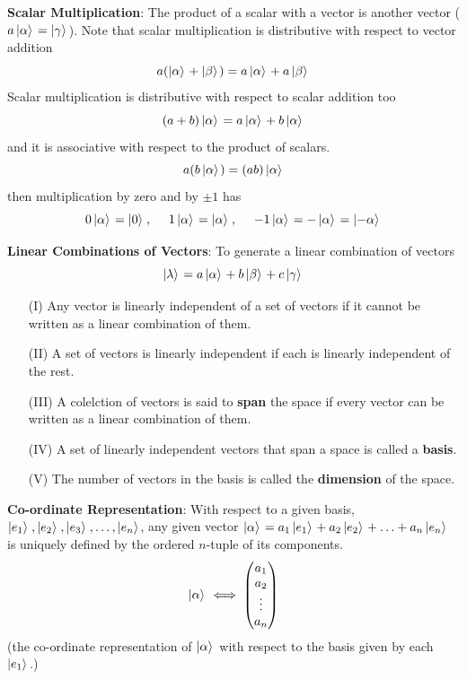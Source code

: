 \documentclass[english, 11pt]{article}
\begin{document}
        {\bf Scalar Multiplication}: The product of a scalar with a vector is another vector ($a\left| \alpha \rangle \right. = \left| \gamma \rangle \right.$). Note that scalar multiplication is distributive with respect to vector addition
        \[ a(\left| \alpha \rangle \right. + \left| \beta \rangle \right.) = a\left| \alpha \rangle \right. + a\left| \beta \rangle \right. \]
        Scalar multiplication is distributive with respect to scalar addition too
        \[ (a + b)\left| \alpha \rangle \right. = a\left| \alpha \rangle \right. + b\left| \alpha \rangle \right. \]
        and it is associative with respect to the product of scalars.
        \[ a(b \left| \alpha \rangle \right.) = (ab)\left| \alpha \rangle \right. \]
        then multiplication by zero and by $\pm 1$ has
        \[ 0\ket{\alpha} = \ket{0}, \ \ \ \ 1\ket{\alpha} = \ket{\alpha}, \ \ \ \ -1\ket{\alpha} = -\ket{\alpha} = \ket{-\alpha} \]
        \newline

        {\bf Linear Combinations of Vectors}: To generate a linear combination of vectors
        \[ \left| \lambda \rangle \right. = a\left| \alpha \rangle \right. + b\left| \beta \rangle \right. + c\left| \gamma \rangle \right. \]
        \begin{itemize}
          \item[(I)] Any vector is linearly independent of a set of vectors if it cannot be written as a linear combination of them.
          \item[(II)] A set of vectors is linearly independent if each is linearly independent of the rest.
          \item[(III)] A colelction of vectors is said to {\bf span} the space if every vector can be written as a linear combination of them.
          \item[(IV)] A set of linearly independent vectors that span a space is called a {\bf basis}.
          \item[(V)] The number of vectors in the basis is called the {\bf dimension} of the space.\newline
        \end{itemize}

        {\bf Co-ordinate Representation}: With respect to a given basis, $\left| e_1 \rangle \right., \left| e_2 \rangle \right., \left| e_3 \rangle \right., \hdots, \left| e_n \rangle \right.$, any given vector $\left| \alpha \rangle \right. = a_1 \left| e_1 \rangle \right. + a_2\left| e_2 \rangle \right. + \hdots + a_n \left| e_n \rangle \right.$ is uniquely defined by the ordered $n$-tuple of its components.
        \[ \left| \alpha \rangle \right. \iff \left(\begin{matrix}a_1 \\ a_2 \\ \vdots \\ a_n\end{matrix}\right) \]
        (the co-ordinate representation of $\left| \alpha \rangle \right.$ with respect to the basis given by each $\left| e_1 \rangle \right.$.)
\end{document}
